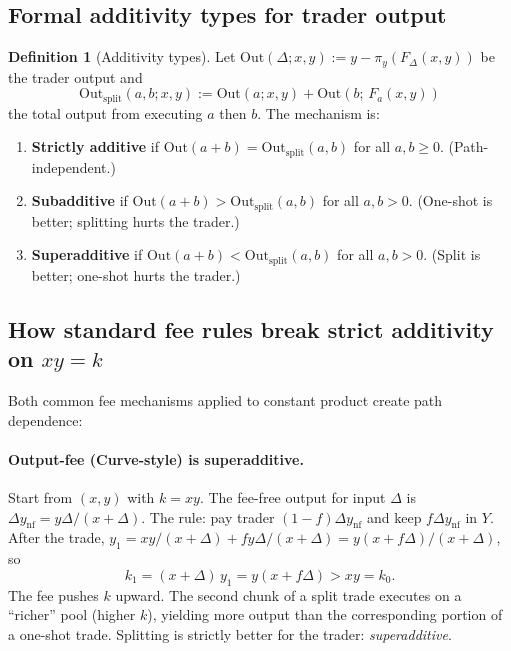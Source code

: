 \documentclass[11pt]{article}
\theoremstyle{definition}
\newtheorem{definition}[theorem]{Definition}
\theoremstyle{remark}
\newcommand{\projY}{\pi_y}
\begin{document}
\subsection{Formal additivity types for trader output}

\begin{definition}[Additivity types]\label{def:additivity-types}
Let $\mathrm{Out}(\Delta;x,y):= y - \projY(F_\Delta(x,y))$ be the trader output and
\[
\mathrm{Out}_{\mathrm{split}}(a,b;x,y) := \mathrm{Out}(a;x,y) + \mathrm{Out}(b;\,F_a(x,y))
\]
the total output from executing $a$ then $b$. The mechanism is:
\begin{enumerate}[label=(\alph*)]
\item \textbf{Strictly additive} if $\mathrm{Out}(a{+}b) = \mathrm{Out}_{\mathrm{split}}(a,b)$ for all $a,b\ge 0$. (Path-independent.)
\item \textbf{Subadditive} if $\mathrm{Out}(a{+}b) > \mathrm{Out}_{\mathrm{split}}(a,b)$ for all $a,b>0$. (One-shot is better; splitting hurts the trader.)
\item \textbf{Superadditive} if $\mathrm{Out}(a{+}b) < \mathrm{Out}_{\mathrm{split}}(a,b)$ for all $a,b>0$. (Split is better; one-shot hurts the trader.)
\end{enumerate}
\end{definition}

\subsection{How standard fee rules break strict additivity on $xy=k$}

Both common fee mechanisms applied to constant product create path dependence:

\paragraph{Output-fee (Curve-style) is superadditive.}
Start from $(x,y)$ with $k=xy$. The fee-free output for input $\Delta$ is $\Delta y_{\mathrm{nf}} = y\Delta/(x{+}\Delta)$.
The rule: pay trader $(1{-}f)\Delta y_{\mathrm{nf}}$ and keep $f\Delta y_{\mathrm{nf}}$ in $Y$.
After the trade, $y_1 = xy/(x{+}\Delta) + fy\Delta/(x{+}\Delta)= y(x{+}f\Delta)/(x{+}\Delta)$, so
\[
k_1 = (x{+}\Delta)\,y_1 = y(x + f\Delta) > xy = k_0.
\]
The fee pushes $k$ upward. The second chunk of a split trade executes on a ``richer'' pool (higher $k$), yielding more output than the corresponding portion of a one-shot trade.
Splitting is strictly better for the trader: \emph{superadditive}.
\end{document}
